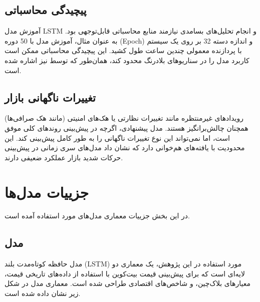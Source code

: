 \subsection{پیچیدگی محاسباتی}
آموزش مدل LSTM و انجام تحلیل‌های بسامدی نیازمند منابع محاسباتی قابل‌توجهی بود. به عنوان مثال، آموزش مدل با 50 دوره (Epoch) و اندازه دسته 32 بر روی یک سیستم با پردازنده معمولی چندین ساعت طول کشید. این پیچیدگی محاسباتی ممکن است کاربرد مدل را در سناریوهای بلادرنگ محدود کند، همان‌طور که توسط \cite{author1} نیز اشاره شده است.

\subsection{تغییرات ناگهانی بازار}
رویدادهای غیرمنتظره مانند تغییرات نظارتی یا هک‌های امنیتی (مانند هک صرافی‌ها) همچنان چالش‌برانگیز هستند. مدل پیشنهادی، اگرچه در پیش‌بینی روندهای کلی موفق است، اما نمی‌تواند این نوع تغییرات ناگهانی را به طور کامل پیش‌بینی کند. این محدودیت با یافته‌های \cite{lo1997market} هم‌خوانی دارد که نشان داد مدل‌های سری زمانی در پیش‌بینی حرکات شدید بازار عملکرد ضعیفی دارند.



\section{جزییات مدل‌ها}
در این بخش جزییات معماری مدل‌های مورد استفاده آمده است.
\subsection{مدل }
مدل حافظه کوتاه‌مدت بلند (LSTM) مورد استفاده در این پژوهش، یک معماری دو لایه‌ای است که برای پیش‌بینی قیمت بیت‌کوین با استفاده از داده‌های تاریخی قیمت، معیارهای بلاک‌چین، و شاخص‌های اقتصادی طراحی شده است. معماری مدل در شکل زیر نشان داده شده است.

